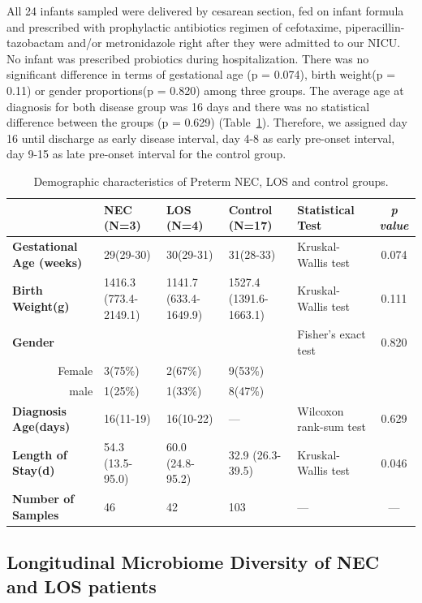 \documentclass[fleqn,10pt]{wlpeerj} %
\begin{document}
  \noindent
   All 24 infants sampled were delivered by cesarean section, fed on infant formula and prescribed with prophylactic antibiotics regimen of cefotaxime, piperacillin-tazobactam and/or metronidazole right after they were admitted to our NICU. No infant was prescribed probiotics during hospitalization. There was no significant difference in terms of gestational age (p = 0.074), birth weight(p = 0.11) or gender proportions(p = 0.820) among three groups. The average age at diagnosis for both disease group was 16 days and there was no statistical difference between the groups (p = 0.629) (Table~\ref{tab:demographic}). Therefore, we assigned day 16 until discharge as early disease interval, day 4-8 as early pre-onset interval, day 9-15 as late pre-onset interval for the control group.
    \begin{table}[!hpb]
       \centering
       \caption{\label{tab:demographic}Demographic characteristics of Preterm NEC, LOS and control groups.}
      \begin{tabular}{lp{1.8cm}p{1.8cm}p{1.8cm}p{2cm}c}
        \toprule
          & \textbf{NEC (N=3)} & \textbf{LOS (N=4)} & \textbf{Control (N=17)} & \textbf{Statistical Test} & \textit{p value} \\ \midrule
        \textbf{Gestational Age (weeks)} & 29(29-30) & 30(29-31) & 31(28-33) & Kruskal-Wallis test & 0.074 \\
        \textbf{Birth Weight(g)} & 1416.3 (773.4-2149.1) & 1141.7 (633.4-1649.9) & 1527.4 (1391.6-1663.1) & Kruskal-Wallis test & 0.111 \\
        \textbf{Gender} &  &  &  & Fisher's exact test & 0.820 \\
        \multicolumn{1}{r}{Female} & 3(75\%) & 2(67\%) & 9(53\%) &  & \\
        \multicolumn{1}{r}{male} & 1(25\%) & 1(33\%) & 8(47\%) &  & \\
        \textbf{Diagnosis Age(days)} & 16(11-19) & 16(10-22) & — & Wilcoxon rank-sum test & 0.629 \\
        \textbf{Length of Stay(d)} & 54.3 (13.5-95.0) & 60.0 (24.8-95.2) & 32.9 (26.3-39.5) & Kruskal-Wallis test & 0.046 \\
        \textbf{Number of Samples} & 46 & 42 & 103 & — & — \\ \bottomrule
      \end{tabular}
    \end{table}

   \subsection*{Longitudinal Microbiome Diversity of NEC and LOS patients}
\end{document}
